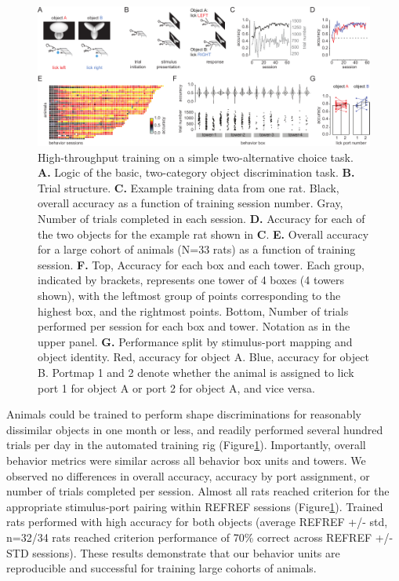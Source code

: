 \begin{figure}[t!]
    \includegraphics[width=\textwidth]{figures/chapter_1/fig_1-2_basic_training/fig_1-2_basic_training.pdf}
    \vspace{.1in}
    \caption[High-throughput training]{High-throughput training on a simple two-alternative choice task. \textbf{A.} Logic of the basic, two-category object discrimination task. \textbf{B.} Trial structure. \textbf{C.} Example training data from one rat. Black, overall accuracy as a function of training session number. Gray, Number of trials completed in each session. \textbf{D.} Accuracy for each of the two objects for the example rat shown in \textbf{C}. \textbf{E.} Overall accuracy for a large cohort of animals (N=33 rats) as a function of training session. \textbf{F.} Top, Accuracy for each box and each tower. Each group, indicated by brackets, represents one tower of 4 boxes (4 towers shown), with the leftmost group of points corresponding to the highest box, and the rightmost points. Bottom, Number of trials performed per session for each box and tower. Notation as in the upper panel. \textbf{G.} Performance split by stimulus-port mapping and object identity. Red, accuracy for object A. Blue, accuracy for object B. Portmap 1 and 2 denote whether the animal is assigned to lick port 1 for object A or port 2 for object A, and vice versa.
    \label{fig:basic_training}}
\end{figure}

Animals could be trained to perform shape discriminations for reasonably dissimilar objects in one month or less, and readily performed several hundred trials per day in the automated training rig (Figure\ref{fig:basic_training}). Importantly, overall behavior metrics were similar across all behavior box units and towers. We observed no differences in overall accuracy, accuracy by port assignment, or number of trials completed per session. Almost all rats reached criterion for the appropriate stimulus-port pairing within REFREF sessions (Figure\ref{fig:basic_training}). Trained rats performed with high accuracy for both objects (average REFREF +/- std, n=32/34 rats reached criterion performance of 70\% correct across REFREF +/- STD sessions). These results demonstrate that our behavior units are reproducible and successful for training large cohorts of animals. 

